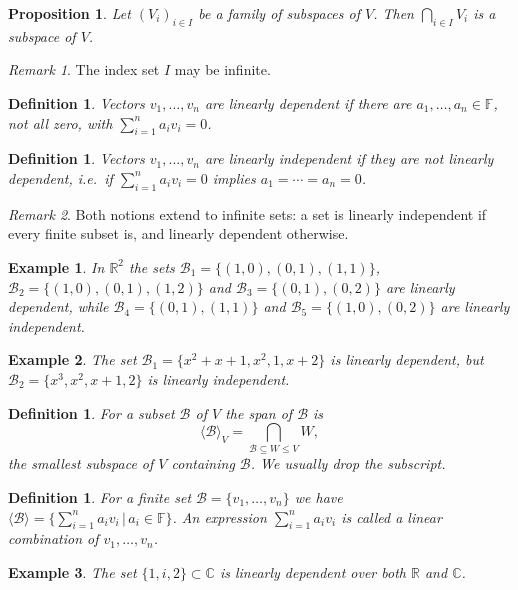 \documentclass[12pt]{article}
\newcommand{\double}{\hspace{2pt}}
\theoremstyle{breakplain}
\newtheorem{prop}[theorem]{Proposition}
\theoremstyle{breakdef}
\newtheorem{definition}[theorem]{Definition}
\newtheorem*{example}{Example}
\theoremstyle{remark}
\newtheorem*{remark}{Remark}
\begin{document}
\begin{prop}
    Let $(V_i)_{i\in I}$ be a family of subspaces of $V$. Then $\bigcap_{i\in I} V_i$ is a subspace of $V$.
\end{prop}
\begin{remark}
    The index set $I$ may be infinite.
\end{remark}
\begin{definition}
    Vectors $v_1,\ldots, v_n$ are \emph{linearly dependent} if there are $a_1, \ldots , a_n \in \mathbb{F}$, not all zero, with $\sum_{i=1}^na_iv_i=0$.
\end{definition}
\begin{definition}
    Vectors $v_1,\ldots,v_n$ are \emph{linearly independent} if they are not linearly dependent, i.e.\ if $\sum_{i=1}^na_iv_i=0$ implies $a_1=\cdots=a_n=0$.
\end{definition}
\begin{remark}
    Both notions extend to infinite sets: a set is linearly independent if every finite subset is, and linearly dependent otherwise.
\end{remark}
\begin{example}
    In $\mathbb{R}^2$ the sets $\mathcal{B}_1=\{ (1,0), (0,1),(1,1)\}$, $\mathcal{B}_2=\{ (1,0), (0,1),(1,2)\}$ and $\mathcal{B}_3=\{ (0,1),(0,2)\}$ are linearly dependent, while $\mathcal{B}_4=\{ (0,1),(1,1)\}$ and $\mathcal{B}_5=\{ (1,0), (0,2)\}$ are linearly independent.
\end{example}
\begin{example}
    The set $\mathcal{B}_1=\{ x^2+x+1, x^2,1,x+2\}$ is linearly dependent, but $\mathcal{B}_2=\{ x^3,x^2,x+1,2\}$ is linearly independent.
\end{example}
\begin{definition}
    For a subset $\mathcal{B}$ of $V$ the \emph{span} of $\mathcal{B}$ is
    \[\langle \mathcal{B}\rangle_V=\bigcap_{\mathcal{B}\subseteq W \leq V} W,\]
    the smallest subspace of $V$ containing $\mathcal{B}$. We usually drop the subscript.
\end{definition}
\begin{definition}
    For a finite set $\mathcal{B}=\{ v_1,\ldots, v_n \}$ we have $\langle \mathcal{B}\rangle=\{ \sum_{i=1}^na_iv_i \double | \double a_i\in\mathbb{F}\}$. An expression $\sum_{i=1}^na_iv_i$ is called a \emph{linear combination} of $v_1, \ldots, v_n$.
\end{definition}
\begin{example}
    The set $\{ 1,i,2\}\subset\mathbb{C}$ is linearly dependent over both $\mathbb{R}$ and $\mathbb{C}$.
\end{example}
\end{document}
